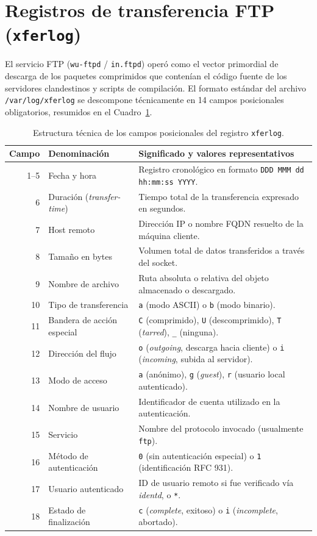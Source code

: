 \section{Registros de transferencia FTP (\texttt{xferlog})}

El servicio FTP (\texttt{wu-ftpd} / \texttt{in.ftpd}) operó como el vector primordial de descarga de los paquetes comprimidos que contenían el código fuente de los servidores clandestinos y scripts de compilación. El formato estándar del archivo \texttt{/var/log/xferlog} se descompone técnicamente en 14 campos posicionales obligatorios, resumidos en el Cuadro~\ref{tab:xferlog_estructura}.

\begin{table}[htbp]
\centering
\scriptsize
\begin{tabularx}{\textwidth}{@{} r l X @{}}
\toprule
\textbf{Campo} & \textbf{Denominación} & \textbf{Significado y valores representativos} \\
\midrule
1--5 & Fecha y hora & Registro cronológico en formato \texttt{DDD MMM dd hh:mm:ss YYYY}. \\
6 & Duración (\textit{transfer-time}) & Tiempo total de la transferencia expresado en segundos. \\
7 & Host remoto & Dirección IP o nombre FQDN resuelto de la máquina cliente. \\
8 & Tamaño en bytes & Volumen total de datos transferidos a través del socket. \\
9 & Nombre de archivo & Ruta absoluta o relativa del objeto almacenado o descargado. \\
10 & Tipo de transferencia & \texttt{a} (modo ASCII) o \texttt{b} (modo binario). \\
11 & Bandera de acción especial & \texttt{C} (comprimido), \texttt{U} (descomprimido), \texttt{T} (\textit{tarred}), \texttt{\_} (ninguna). \\
12 & Dirección del flujo & \texttt{o} (\textit{outgoing}, descarga hacia cliente) o \texttt{i} (\textit{incoming}, subida al servidor). \\
13 & Modo de acceso & \texttt{a} (anónimo), \texttt{g} (\textit{guest}), \texttt{r} (usuario local autenticado). \\
14 & Nombre de usuario & Identificador de cuenta utilizado en la autenticación. \\
15 & Servicio & Nombre del protocolo invocado (usualmente \texttt{ftp}). \\
16 & Método de autenticación & \texttt{0} (sin autenticación especial) o \texttt{1} (identificación RFC 931). \\
17 & Usuario autenticado & ID de usuario remoto si fue verificado vía \textit{identd}, o \texttt{*}. \\
18 & Estado de finalización & \texttt{c} (\textit{complete}, exitoso) o \texttt{i} (\textit{incomplete}, abortado). \\
\bottomrule
\end{tabularx}
\caption{Estructura técnica de los campos posicionales del registro \texttt{xferlog}.}
\label{tab:xferlog_estructura}
\end{table}

